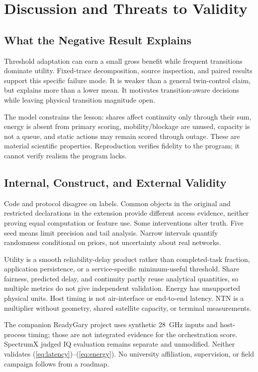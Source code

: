 \documentclass[10pt,twocolumn]{article}
\begin{document}
\section{Discussion and Threats to Validity}
\subsection{What the Negative Result Explains}
Threshold adaptation can earn a small gross benefit while frequent transitions dominate utility. Fixed-trace decomposition, source inspection, and paired results support this specific failure mode. It is weaker than a general twin-control claim, but explains more than a lower mean. It motivates transition-aware decisions while leaving physical transition magnitude open.

The model constrains the lesson: shares affect continuity only through their sum, energy is absent from primary scoring, mobility/blockage are unused, capacity is not a queue, and static actions may remain scored through outage. These are material scientific properties. Reproduction verifies fidelity to the program; it cannot verify realism the program lacks.

\subsection{Internal, Construct, and External Validity}
Code and protocol disagree on labels. Common objects in the original and restricted declarations in the extension provide different access evidence, neither proving equal computation or feature use. Some interventions alter truth. Five seed means limit precision and tail analysis. Narrow intervals quantify randomness conditional on priors, not uncertainty about real networks.

Utility is a smooth reliability-delay product rather than completed-task fraction, application persistence, or a service-specific minimum-useful threshold. Share fairness, predicted delay, and continuity partly reuse analytical quantities, so multiple metrics do not give independent validation. Energy has unsupported physical units. Host timing is not air-interface or end-to-end latency. NTN is a multiplier without geometry, shared satellite capacity, or terminal measurements.

The companion ReadyGary project uses synthetic 28~GHz inputs and host-process timing; those are not integrated evidence for the orchestration score. SpectrumX judged IQ evaluation remains separate and unmodified. Neither validates (\ref{eq:latency})--(\ref{eq:energy}). No university affiliation, supervision, or field campaign follows from a roadmap.
\end{document}
